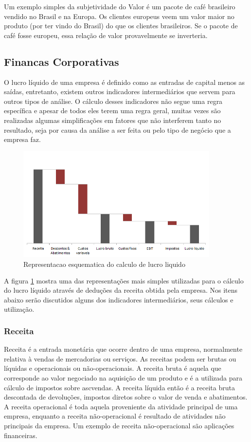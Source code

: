 \documentclass[12pt]{article}
\begin{document}
Um exemplo simples da subjetividade do Valor é um pacote de café brasileiro vendido no Brasil e na Europa. Os clientes europeus veem um valor maior no produto (por ter vindo do Brasil) do que os clientes brasileiros. Se o pacote de café fosse europeu, essa relação de valor provavelmente se inverteria.

\subsection{Financas Corporativas}
O lucro líquido de uma empresa é definido como as entradas de capital menos as saídas, entretanto, existem outros indicadores intermediários que servem para outros tipos de análise. O cálculo desses indicadores não segue uma regra específica e apesar de todos eles terem uma regra geral, muitas vezes são realizadas algumas simplificações em fatores que não interferem tanto no resultado, seja por causa da análise a ser feita ou pelo tipo de negócio que a empresa faz. 


\begin{figure}[h!]
	\centering
	\includegraphics[width=0.9\textwidth]{img/finance.png}
	\caption{Representacao esquematica do calculo de lucro liquido}
	\label{fig:lucro}
\end{figure}

A figura \ref{fig:lucro} mostra uma das representações mais simples utilizadas para o cálculo do lucro líquido através de deduções da receita obtida pela empresa. Nos itens abaixo serão discutidos alguns dos indicadores intermediários, seus cálculos e utilização. 

\subsubsection{Receita}
Receita é a entrada monetária que ocorre dentro de uma empresa, normalmente relativa à vendas de mercadorias ou serviços. As receitas podem ser brutas ou líquidas e operacionais ou não-operacionais. A receita bruta é aquela que corresponde ao valor negociado na aquisição de um produto e é a utilizada para cálculo de impostos sobre ascvendas. A receita líquida então é a receita bruta descontada de devoluções, impostos diretos sobre o valor de venda e abatimentos.
A receita operacional é toda aquela proveniente da atividade principal de uma empresa, enquanto a receita não-operacional é resultado de atividades não principais da empresa. Um exemplo de receita não-operacional são aplicações financeiras.
\end{document}

